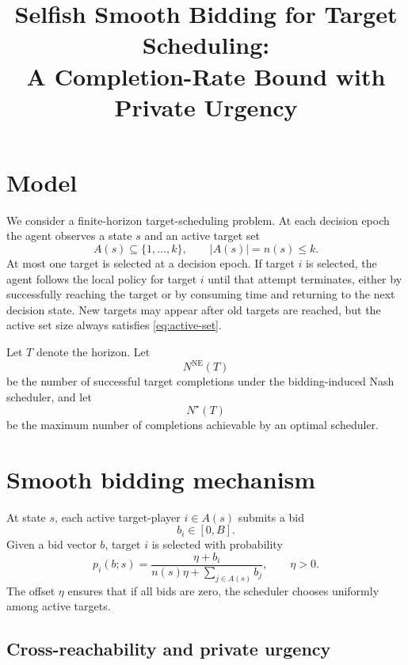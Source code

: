\documentclass[11pt]{article}
\title{Selfish Smooth Bidding for Target Scheduling:\\A Completion-Rate Bound with Private Urgency}
\author{}
\date{}
\begin{document}
\maketitle

\section{Model}

We consider a finite-horizon target-scheduling problem. At each decision epoch the agent observes a state
$s$ and an active target set
\begin{equation}
  A(s) \subseteq \{1,\dots,k\}, \qquad |A(s)| = n(s) \le k .
  \label{eq:active-set}
\end{equation}
At most one target is selected at a decision epoch. If target $i$ is selected, the agent follows the local policy
for target $i$ until that attempt terminates, either by successfully reaching the target or by consuming time and
returning to the next decision state. New targets may appear after old targets are reached, but the active set size
always satisfies \eqref{eq:active-set}.

Let $T$ denote the horizon. Let
\begin{equation}
  N^{\mathrm{NE}}(T)
\end{equation}
be the number of successful target completions under the bidding-induced Nash scheduler, and let
\begin{equation}
  N^\star(T)
\end{equation}
be the maximum number of completions achievable by an optimal scheduler.

\section{Smooth bidding mechanism}

At state $s$, each active target-player $i\in A(s)$ submits a bid
\begin{equation}
  b_i \in [0,B] .
  \label{eq:bid-domain}
\end{equation}
Given a bid vector $b$, target $i$ is selected with probability
\begin{equation}
  p_i(b;s)
  =
  \frac{\eta+b_i}{n(s)\eta + \sum_{j\in A(s)} b_j},
  \qquad \eta>0.
  \label{eq:proportional-allocation}
\end{equation}
The offset $\eta$ ensures that if all bids are zero, the scheduler chooses uniformly among active targets.

\subsection{Cross-reachability and private urgency}
\end{document}
